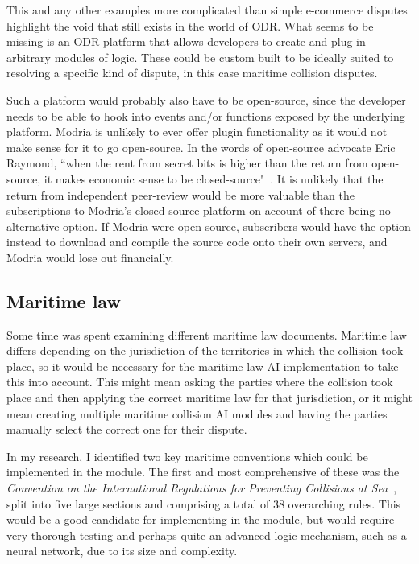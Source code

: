 This and any other examples more complicated than simple e-commerce disputes highlight the void that still exists in the world of ODR. What seems to be missing is an ODR platform that allows developers to create and plug in arbitrary modules of logic. These could be custom built to be ideally suited to resolving a specific kind of dispute, in this case maritime collision disputes.

Such a platform would probably also have to be open-source, since the developer needs to be able to hook into events and/or functions exposed by the underlying platform. Modria is unlikely to ever offer plugin functionality as it would not make sense for it to go open-source. In the words of open-source advocate Eric Raymond, ``when the rent from secret bits is higher than the return from open-source, it makes economic sense to be closed-source"~\cite{eric:catB}. It is unlikely that the return from independent peer-review would be more valuable than the subscriptions to Modria's closed-source platform on account of there being no alternative option. If Modria were open-source, subscribers would have the option instead to download and compile the source code onto their own servers, and Modria would lose out financially.

\subsection{Maritime law}

Some time was spent examining different maritime law documents. Maritime law differs depending on the jurisdiction of the territories in which the collision took place, so it would be necessary for the maritime law AI implementation to take this into account. This might mean asking the parties where the collision took place and then applying the correct maritime law for that jurisdiction, or it might mean creating multiple maritime collision AI modules and having the parties manually select the correct one for their dispute.

In my research, I identified two key maritime conventions which could be implemented in the module. The first and most comprehensive of these was the \emph{Convention on the International Regulations for Preventing Collisions at Sea}~\cite{law:long}, split into five large sections and comprising a total of 38 overarching rules. This would be a good candidate for implementing in the module, but would require very thorough testing and perhaps quite an advanced logic mechanism, such as a neural network, due to its size and complexity.

